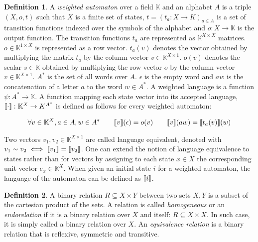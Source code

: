 \documentclass{article}
\theoremstyle{plain}%
\theoremstyle{definition}
\newtheorem{defn}{Definition}[section]
\theoremstyle{remark}
\def\K{\mathbb{K}}
\DeclarePairedDelimiter\sqmap{\llbracket}{\rrbracket}
\begin{document}
\begin{defn}
  A \textit{weighted automaton} over a field $\K$ and an alphabet $A$ is a triple 
  $(X,o,t)$ such that $X$ is a finite set of states, $t = (t_a : X \to K)_{a \in A}$
  is a set of transition functions indexed over the symbols of the alphabet and $o : X 
  \to \K$ is the output function. The transition functions $t_a$ are represented as
  $\K^{X \times X}$ matrices. $o \in \K^{1 \times X}$ is represented as a row vector.
  $t_a(v)$ denotes the vector obtained by multiplying the matrix $t_a$ by the column 
  vector $v  \in \K^{X \times 1}$. $o(v)$ denotes the scalar $s \in \K$ obtained by 
  multiplying the row vector $o$ by the column vector $v \in \K^{X \times 1}$.
  $A^*$ is the set of all words over $A$. $\epsilon$ is the empty word and $aw$ is the
  concatenation of a letter $a$ to the word $w \in A^*$.
  A weighted language is a function $\psi: A^* \to \K$.
  A function mapping each state vector into its 
  accepted language, $\sqmap{\cdot}: \K^X \to K^{A^*}$ is defined as follows for every weighted automaton:

  \begin{equation*}
    \begin{aligned}
      \forall v \in \K^X, a \in A, w \in A^* \quad \quad
      \sqmap{v}(\epsilon) = o(v) \quad \quad
      \sqmap{v}(aw) = \sqmap{t_a(v)}(w)  
    \end{aligned}
  \end{equation*}

  Two vectors $v_1, v_2 \in \K^{X\times 1}$ are called language equivalent, denoted with $v_1 \sim v_2 \iff \sqmap
  {v_1} = \sqmap{v_2}$. One can extend the notion of language equivalence to states rather
  than for vectors by assigning to each state $x \in X$ the corresponding unit vector 
  $e_x \in \K^X$. When given an initial state $i$ for a weighted automaton, the language 
  of the automaton can be defined as $\sqmap{i}$.
\end{defn}


\begin{defn}
  A binary relation $R \subseteq X \times Y$ between two sets $X, Y$ is a subset of the 
  cartesian product of the sets. A relation is called \textit{homogeneous} or an \textit
  {endorelation} if it is a binary relation over $X$ and itself: $R \subseteq X \times
   X$. 
  In such case, it is simply called a binary relation over $X$.
  An \textit{equivalence relation} is a binary relation that is reflexive, symmetric and
  transitive. 
\end{defn}
  
\end{document}
